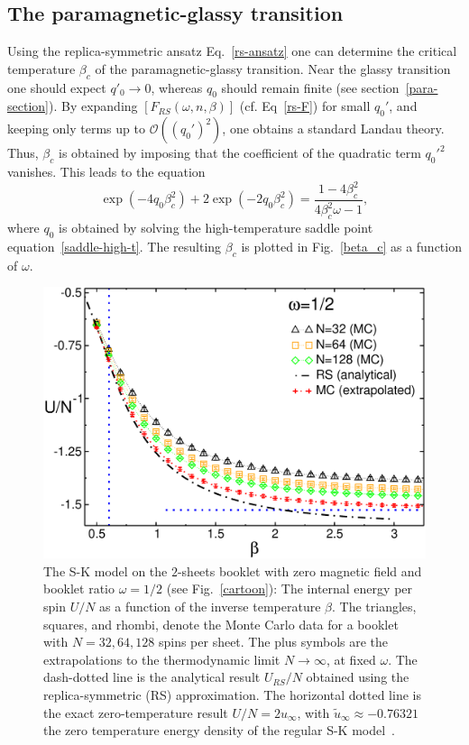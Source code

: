 \documentclass[twocolumn,superscriptaddress,prb,10pt]{revtex4-1}
\begin{document}
\subsection{The paramagnetic-glassy transition}
\label{tc-section}

Using the replica-symmetric ansatz Eq.~\eqref{rs-ansatz} one can determine 
the critical temperature $\beta_c$ of the paramagnetic-glassy transition. 
Near the glassy transition one should expect $q'_0\to0$, whereas $q_0$ 
should remain finite (see section~\ref{para-section}). By expanding $[F_{RS}(\omega,n,\beta)]$ 
(cf. Eq~\eqref{rs-F}) for small $q_0'$, and keeping only terms up to ${\mathcal O}((q_0')^2)$, 
one obtains a standard Landau theory. Thus, $\beta_c$ is obtained by imposing that the 
coefficient of the quadratic term $q_0'^2$ vanishes. This leads to the equation 
%
\begin{equation}
\exp(-4q_0\beta^2_c)+2\exp(-2q_0\beta^2_c)=\frac{1-4\beta^2_c}
{4\beta^2_c\omega-1},
\label{tc}
\end{equation}
%
where $q_0$ is obtained by solving the high-temperature saddle point equation~\eqref{saddle-high-t}. 
The resulting $\beta_c$ is plotted in Fig.~\ref{beta_c} as a function of $\omega$. 

\begin{figure}[t]
\includegraphics*[width=0.93\linewidth]{./draft_figs/U_w05}
\caption{
 The S-K model on the $2$-sheets booklet with zero magnetic field and 
 booklet ratio $\omega=1/2$ (see Fig.~\ref{cartoon}): The internal energy 
 per spin $U/N$ as a function of the inverse temperature $\beta$. The triangles, 
 squares, and rhombi, denote the Monte Carlo data for a booklet with 
 $N=32,64,128$ spins per sheet. The plus symbols are the extrapolations to the 
 thermodynamic limit $N\to\infty$, at fixed $\omega$. The dash-dotted line is the 
 analytical result $U_{RS}/N$ obtained using the replica-symmetric (RS) approximation. 
 The horizontal dotted line is the exact zero-temperature result $U/N=2u_{\infty}$, 
 with $\tilde u_{\infty}\approx-0.76321$ the zero temperature energy density of the 
 regular S-K model~\cite{parisi-1979,parisi-1983}.
}
\label{U-MC}
\end{figure}
\end{document}

